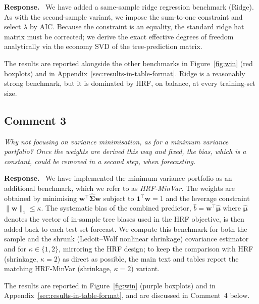 \documentclass[12pt]{article}
\newcommand{\comment}[1]{\begin{refbox}\textit{#1}\end{refbox}}
\newcommand{\response}{\medskip\noindent\textbf{Response.}\ }
\begin{document}
\response
We have added a same-sample ridge regression benchmark (Ridge).
As with the second-sample variant, we impose the sum-to-one constraint and
select $\lambda$ by AIC.
Because the constraint is an equality, the standard ridge hat matrix must be
corrected; we derive the exact effective degrees of freedom analytically via
the economy SVD of the tree-prediction matrix.

The results are reported alongside the other benchmarks in Figure~\ref{fig:win}
(red boxplots) and in Appendix~\ref{sec:results-in-table-format}.
Ridge is a reasonably strong benchmark, but it is dominated by HRF, on
balance, at every training-set size.

\subsection*{Comment 3}

\comment{Why not focusing on variance minimisation, as for a minimum variance
portfolio?  Once the weights are derived this way and fixed, the bias, which
is a constant, could be removed in a second step, when forecasting.}

\response
We have implemented the minimum variance portfolio as an additional
benchmark, which we refer to as \textit{HRF-MinVar}.
The weights are obtained by minimising $\mathbf{w}^{\top}\widehat{\boldsymbol{\Sigma}}\mathbf{w}$
subject to $\mathbf{1}^{\top}\mathbf{w}=1$ and the leverage constraint
$\|\mathbf{w}\|_1\leq\kappa$.
The systematic bias of the combined predictor,
$\hat{b} = \mathbf{w}^{\top}\hat{\boldsymbol{\mu}}$ where $\hat{\boldsymbol{\mu}}$
denotes the vector of in-sample tree biases used in the HRF objective, is
then added back to each test-set forecast.
We compute this benchmark for both the sample and the shrunk
(Ledoit--Wolf nonlinear shrinkage) covariance estimator and for
$\kappa \in \{1, 2\}$, mirroring the HRF design; to keep the comparison
with HRF (shrinkage, $\kappa = 2$) as direct as possible, the main text
and tables report the matching HRF-MinVar (shrinkage, $\kappa = 2$)
variant.

The results are reported in Figure~\ref{fig:win} (purple boxplots) and in
Appendix~\ref{sec:results-in-table-format}, and are discussed in
Comment~4 below.
\end{document}

